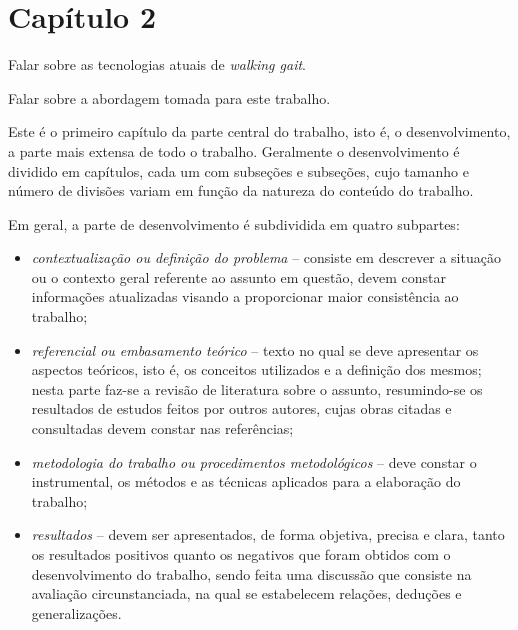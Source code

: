 
\chapter{Capítulo 2}

\begin{guide}
	Falar sobre as tecnologias atuais de \textit{walking gait}.
\end{guide}

\begin{guide}
	Falar sobre a abordagem tomada para este trabalho.
\end{guide}

Este é o primeiro capítulo da parte central do trabalho, isto é, o desenvolvimento, a parte mais extensa de todo o trabalho. Geralmente o desenvolvimento é dividido em capítulos, cada um com subseções e subseções, cujo tamanho e número de divisões variam em função da natureza do conteúdo do trabalho.

Em geral, a parte de desenvolvimento é subdividida em quatro subpartes:

\begin{itemize}
   \item \textit{contextualização ou definição do problema} -- consiste em
   descrever a situação ou o contexto geral referente ao assunto em questão,
   devem constar informações atualizadas visando a proporcionar maior
   consistência ao trabalho;
   \item \textit{referencial ou embasamento teórico} -- texto no qual se deve
   apresentar os aspectos teóricos, isto é, os conceitos utilizados e a
   definição dos mesmos; nesta parte faz-se a revisão de literatura sobre o
   assunto, resumindo-se os resultados de estudos feitos por outros autores,
   cujas obras citadas e consultadas devem constar nas referências;
   \item \textit{metodologia do trabalho ou procedimentos metodológicos} -- deve
   constar o instrumental, os métodos e as técnicas aplicados para a elaboração
   do trabalho;
   \item \textit{resultados} -- devem ser apresentados, de forma objetiva,
   precisa e clara, tanto os resultados positivos quanto os negativos que foram
   obtidos com o desenvolvimento do trabalho, sendo feita uma discussão que
   consiste na avaliação circunstanciada, na qual se estabelecem relações,
   deduções e generalizações.
\end{itemize}


